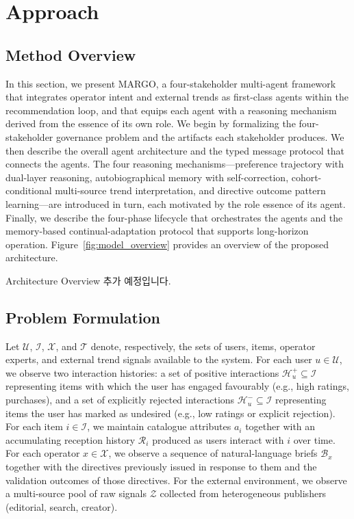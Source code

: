 \documentclass[master,english,final]{postech-ucs}
\begin{document}
\chapter{Approach}

\section{Method Overview}

In this section, we present MARGO, a four-stakeholder multi-agent framework that integrates operator intent and external trends as first-class agents within the recommendation loop, and that equips each agent with a reasoning mechanism derived from the essence of its own role.
We begin by formalizing the four-stakeholder governance problem and the artifacts each stakeholder produces.
We then describe the overall agent architecture and the typed message protocol that connects the agents.
The four reasoning mechanisms---preference trajectory with dual-layer reasoning, autobiographical memory with self-correction, cohort-conditional multi-source trend interpretation, and directive outcome pattern learning---are introduced in turn, each motivated by the role essence of its agent.
Finally, we describe the four-phase lifecycle that orchestrates the agents and the memory-based continual-adaptation protocol that supports long-horizon operation.
Figure~\ref{fig:model_overview} provides an overview of the proposed architecture.

Architecture Overview 추가 예정입니다.

\section{Problem Formulation}

Let $\mathcal{U}$, $\mathcal{I}$, $\mathcal{X}$, and $\mathcal{T}$ denote, respectively, the sets of users, items, operator experts, and external trend signals available to the system.
For each user $u \in \mathcal{U}$, we observe two interaction histories: a set of positive interactions $\mathcal{H}^+_u \subseteq \mathcal{I}$ representing items with which the user has engaged favourably (e.g., high ratings, purchases), and a set of explicitly rejected interactions $\mathcal{H}^-_u \subseteq \mathcal{I}$ representing items the user has marked as undesired (e.g., low ratings or explicit rejection).
For each item $i \in \mathcal{I}$, we maintain catalogue attributes $a_i$ together with an accumulating reception history $\mathcal{R}_i$ produced as users interact with $i$ over time.
For each operator $x \in \mathcal{X}$, we observe a sequence of natural-language briefs $\mathcal{B}_x$ together with the directives previously issued in response to them and the validation outcomes of those directives.
For the external environment, we observe a multi-source pool of raw signals $\mathcal{Z}$ collected from heterogeneous publishers (editorial, search, creator).
\end{document}

